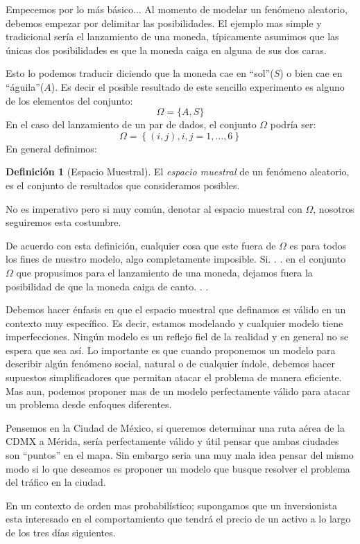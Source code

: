 \documentclass[a4paper,12pt,twoside]{libro}
\theoremstyle{definition}
\newtheorem{definition}{Definición}[chapter]
\begin{document}
Empecemos por lo más básico... Al momento de modelar un fenómeno aleatorio, debemos empezar por delimitar las posibilidades. El ejemplo mas simple  y tradicional sería el lanzamiento de una moneda, típicamente asumimos que las únicas dos posibilidades es que la moneda caiga en alguna de sus dos caras.

Esto lo podemos traducir diciendo que la moneda cae en ``sol''($S$) o bien cae en ``águila''($A$). Es decir el posible resultado de este sencillo experimento es alguno de los elementos del conjunto:
$$\Omega = \{A, S\}$$
%
En el caso del lanzamiento de un par de dados, el conjunto $\Omega$ podría ser:
$$\Omega = \left\{(i , j), i , j = 1,\ldots , 6\right\}$$
%
En general definimos:

\begin{definition} [Espacio Muestral]
	El \emph{espacio muestral} de un fenómeno aleatorio, es el conjunto de resultados que consideramos posibles.
\end{definition}

No es imperativo pero si muy común, denotar al espacio muestral con $\Omega$, nosotros seguiremos esta costumbre.

De acuerdo con esta definición, cualquier cosa que este fuera de $\Omega$ es para todos los fines de nuestro modelo, algo completamente imposible. Si. . . en el conjunto $\Omega$ que propusimos para el lanzamiento de una moneda, dejamos fuera la posibilidad de que la moneda caiga de canto. . .


Debemos hacer énfasis en que el espacio muestral que definamos es válido en un contexto muy específico. Es decir, estamos modelando y cualquier modelo tiene imperfecciones. Ningún modelo es un reflejo fiel de la realidad y en general no se espera que sea así. Lo importante es que cuando proponemos un modelo para describir algún fenómeno social, natural o de cualquier índole, debemos hacer supuestos simplificadores que permitan atacar el problema de manera eficiente. Mas aun, podemos proponer mas de un modelo perfectamente válido para atacar un problema desde enfoques diferentes.

Pensemos en la Ciudad de México, si queremos determinar una ruta aérea de la CDMX a Mérida, sería perfectamente válido y útil pensar que ambas ciudades son ``puntos'' en el mapa. Sin embargo seria una muy mala idea pensar del mismo modo si lo que deseamos es proponer un modelo que busque resolver el problema del tráfico en la ciudad.

En un contexto de orden mas probabilístico; supongamos que un inversionista esta interesado en el comportamiento que tendrá el precio de un activo a lo largo de los tres días siguientes.
\end{document}
